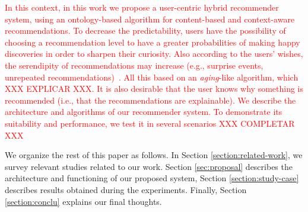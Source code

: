 

\textcolor{red}{In this context, in this work we propose a user-centric hybrid recommender system, using an ontology-based algorithm for content-based and context-aware recommendations. To decrease the predictability, users have the possibility of choosing  a recommendation level to have a greater probabilities of making happy discoveries in order to sharpen their curiosity. Also according to the users’ wishes, the serendipity of recommendations may increase (e.g., surprise events, unrepeated recommendations)~\cite{kotkov2016survey}. All this based on an {\it aging}-like algorithm, which XXX EXPLICAR XXX.  It is also desirable that the user knows why something is recommended (i.e., that the recommendations are explainable). We describe the architecture and algorithms of our recommender system. To demonstrate its suitability and performance, we test it in several scenarios XXX COMPLETAR XXX}


We organize the rest of this paper as follows. In Section \ref{section:related-work}, we survey 
relevant studies related to our work.
Section \ref{sec:proposal} describes the architecture and functioning of our proposed system, Section \ref{section:study-case} describes results obtained during the experiments. Finally, Section \ref{section:conclu} explains our final thoughts.


